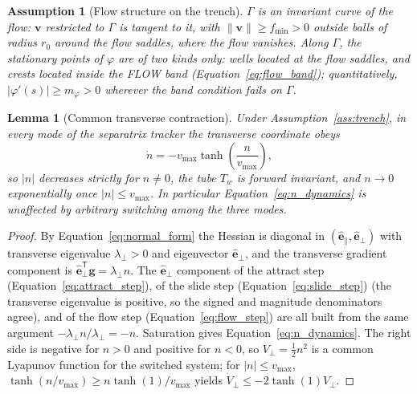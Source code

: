 \documentclass[12pt, letterpaper, oneside]{report}
\newtheorem{lemma}[theorem]{Lemma}
\newtheorem{assumption}[theorem]{Assumption}
\begin{document}
\begin{assumption}[Flow structure on the trench]
\label{ass:flow}
$\Gamma$ is an invariant curve of the flow: $\mathbf{v}$ restricted to
$\Gamma$ is tangent to it, with $\lVert\mathbf{v}\rVert\geq f_{\min}>0$
outside balls of radius $r_0$ around the flow saddles, where the flow
vanishes. Along $\Gamma$, the stationary points of $\varphi$ are of two
kinds only: wells located at the flow saddles, and crests located inside
the FLOW band (Equation~\eqref{eq:flow_band}); quantitatively,
$|\varphi'(s)|\geq m_\varphi>0$ wherever the band condition fails on
$\Gamma$.
\end{assumption}

\begin{lemma}[Common transverse contraction]
\label{lem:transverse}
Under Assumption~\ref{ass:trench}, in every mode of the separatrix tracker
the transverse coordinate obeys
\begin{equation}
\dot n = -v_{\max}\tanh\!\left(\frac{n}{v_{\max}}\right),
\label{eq:n_dynamics}
\end{equation}
so $|n|$ decreases strictly for $n\neq0$, the tube $T_w$ is forward
invariant, and $n\to0$ exponentially once $|n|\leq v_{\max}$. In
particular Equation~\eqref{eq:n_dynamics} is unaffected by arbitrary
switching among the three modes.
\end{lemma}

\begin{proof}
By Equation~\eqref{eq:normal_form} the Hessian is diagonal in
$(\hat{\mathbf{e}}_\parallel,\hat{\mathbf{e}}_\perp)$ with transverse
eigenvalue $\lambda_\perp>0$ and eigenvector $\hat{\mathbf{e}}_\perp$, and
the transverse gradient component is
$\hat{\mathbf{e}}_\perp^{\mathsf T}\mathbf{g}=\lambda_\perp n$. The
$\hat{\mathbf{e}}_\perp$ component of the attract step
(Equation~\eqref{eq:attract_step}), of the slide step
(Equation~\eqref{eq:slide_step}) (the transverse eigenvalue is positive,
so the signed and magnitude denominators agree), and of the flow step
(Equation~\eqref{eq:flow_step}) are all built from the same argument
$-\lambda_\perp n/\lambda_\perp=-n$. Saturation gives
Equation~\eqref{eq:n_dynamics}. The right side is negative for $n>0$ and
positive for $n<0$, so $V_\perp=\tfrac12n^2$ is a common Lyapunov function
for the switched system; for $|n|\leq v_{\max}$,
$\tanh(n/v_{\max})\geq n\tanh(1)/v_{\max}$ yields
$\dot V_\perp\leq-2\tanh(1)V_\perp$.
\end{proof}
\end{document}
